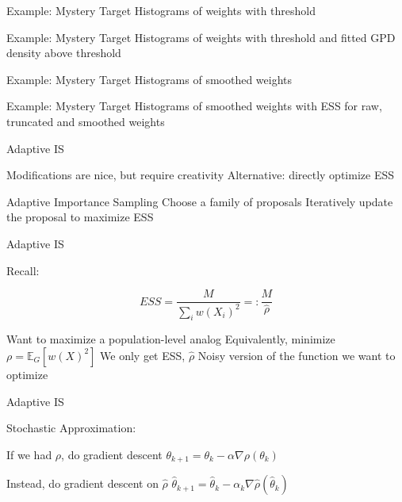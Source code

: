 \documentclass[14pt]{beamer}
\newcommand{\bE}{\mathbb{E}}
\begin{document}
\begin{frame}{Example: Mystery Target}
    Histograms of weights with threshold
\end{frame}

\begin{frame}{Example: Mystery Target}
    Histograms of weights with threshold and fitted GPD density above threshold
\end{frame}

\begin{frame}{Example: Mystery Target}
    Histograms of smoothed weights
\end{frame}

\begin{frame}{Example: Mystery Target}
    Histograms of smoothed weights with ESS for raw, truncated and smoothed weights
\end{frame}

\begin{frame}{Adaptive IS}
    \begin{outline}
        \1 Modifications are nice, but require creativity
        \1 Alternative: directly optimize ESS \newline

        \1 Adaptive Importance Sampling \citep{Aky21}
            \2 Choose a family of proposals
            \2 Iteratively update the proposal to maximize ESS
    \end{outline}
\end{frame}

\begin{frame}{Adaptive IS}
    \begin{outline}
        \1 Recall: 
    \end{outline}
    \begin{equation*}
        ESS = \frac{M}{\sum_i w(X_i)^2} =: \frac{M}{\hat{\rho}}
    \end{equation*}
    \begin{outline}
        \1 Want to maximize a population-level analog
            \2 Equivalently, minimize $\rho = \bE_G \left[ w(X)^2 \right]$ \newline
        \1 We only get ESS, $\hat{\rho}$
        \1 Noisy version of the function we want to optimize
    \end{outline}
\end{frame}

\begin{frame}{Adaptive IS}
    \begin{outline}
        \1 Stochastic Approximation: \newline

        \1 If we had $\rho$, do gradient descent
        \1 $\theta_{k+1} = \theta_k - \alpha \nabla \rho(\theta_k)$ \newline

        \1 Instead, do gradient descent on $\hat{\rho}$
        \1 $\hat{\theta}_{k+1} = \hat{\theta}_k - \alpha_k \nabla \hat{\rho}(\hat{\theta}_k)$
    \end{outline}
\end{frame}
\end{document}
